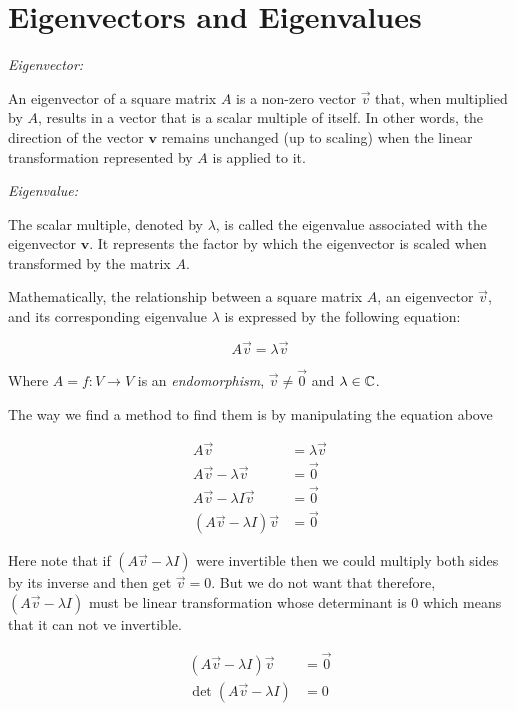 \newpage
\section{Eigenvectors and Eigenvalues}

\emph{Eigenvector:}

An eigenvector of a square matrix \(A\) is a non-zero vector \(\vec{v}\) that, when multiplied by 
\(A\), results in a vector that is a scalar multiple of itself. In other words, the direction of the 
vector \(\mathbf{v}\) remains unchanged (up to scaling) when the linear transformation represented by 
\(A\) is applied to it.
\vspace{\baselineskip}

\emph{Eigenvalue:}

The scalar multiple, denoted by \(\lambda\), is called the eigenvalue associated with the eigenvector 
\(\mathbf{v}\). It represents the factor by which the eigenvector is scaled when transformed by 
the matrix \(A\).
\vspace{\baselineskip}

Mathematically, the relationship between a square matrix \(A\), an eigenvector \(\vec{v}\), 
and its corresponding eigenvalue \(\lambda\) is expressed by the following equation:

\[
    A\vec{v} = \lambda\vec{v}
\]

Where \(A = f: V \to V\) is an \emph{endomorphism}, \(\vec{v} \ne \vec{0}\) and  \(\lambda \in \mathbb{C}\).
\vspace{\baselineskip}

The way we find a method to find them is by manipulating the equation above

\begin{align*}    
    A\vec{v} &= \lambda\vec{v}\\
    A\vec{v} - \lambda\vec{v} &= \vec{0}\\
    A\vec{v} - \lambda I \vec{v} &= \vec{0}\\
    (A\vec{v} - \lambda I) \vec{v} &= \vec{0}
\end{align*}

Here note that if \((A\vec{v} - \lambda I)\) were invertible then we could multiply both sides by 
its inverse and then get \(\vec{v} = 0\). But we do not want that therefore, \((A\vec{v} - \lambda I)\) 
must be linear transformation whose determinant is \(0\) which means that it can not ve invertible.

\begin{align*}    
    (A\vec{v} - \lambda I) \vec{v} &= \vec{0}\\
    \det (A\vec{v} - \lambda I)  &= 0
\end{align*}

